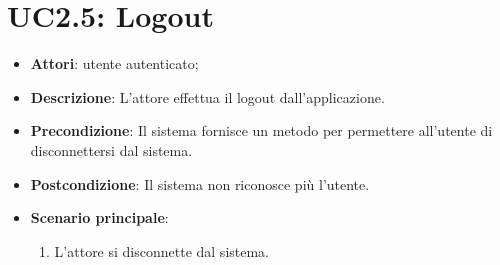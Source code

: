 \section{UC2.5: Logout}
\label{UC2.5}
\begin{itemize}
	\item \textbf{Attori}: utente autenticato;
	\item \textbf{Descrizione}: L'attore effettua il logout dall'applicazione.
	\item \textbf{Precondizione}: Il sistema fornisce un metodo per permettere all'utente di disconnettersi dal sistema.
	\item \textbf{Postcondizione}: Il sistema non riconosce più l'utente.
	\item \textbf{Scenario principale}:
	\begin{enumerate} \item L'attore si disconnette dal sistema.\end{enumerate}
\end{itemize}